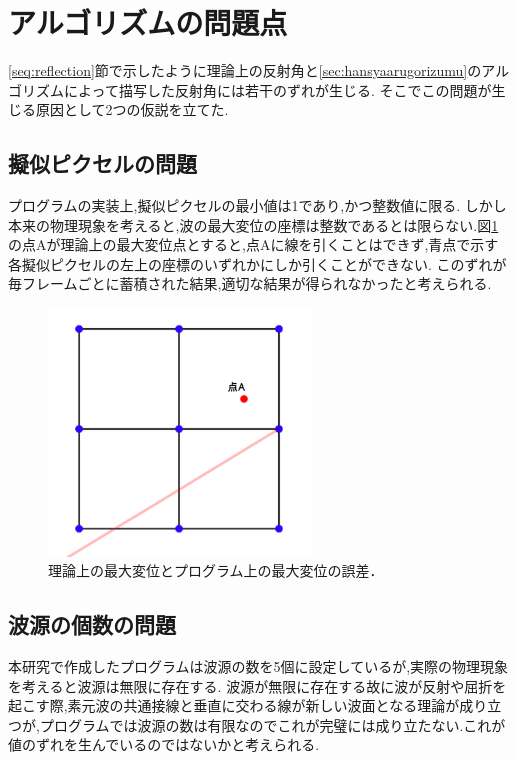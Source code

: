 \section{アルゴリズムの問題点}
\ref{seq:reflection}節で示したように理論上の反射角と\ref{sec:hansyaarugorizumu}のアルゴリズムによって描写した反射角には若干のずれが生じる. そこでこの問題が生じる原因として2つの仮説を立てた.
\subsection{擬似ピクセルの問題}
\label{seq:pxcelproblem}
プログラムの実装上,擬似ピクセルの最小値は1であり,かつ整数値に限る. しかし本来の物理現象を考えると,波の最大変位の座標は整数であるとは限らない.図\ref{fig:pixcelproblem}の点Aが理論上の最大変位点とすると,点Aに線を引くことはできず,青点で示す各擬似ピクセルの左上の座標のいずれかにしか引くことができない. このずれが毎フレームごとに蓄積された結果,適切な結果が得られなかったと考えられる.
\begin{figure}[htbp]
 \begin{center}
  \includegraphics[width=70mm]{../considaration/pixcelproblem.png}
 \end{center}
 \caption{理論上の最大変位とプログラム上の最大変位の誤差．}
 \label{fig:pixcelproblem}
\end{figure}

\subsection{波源の個数の問題}
本研究で作成したプログラムは波源の数を5個に設定しているが,実際の物理現象を考えると波源は無限に存在する.
波源が無限に存在する故に波が反射や屈折を起こす際,素元波の共通接線と垂直に交わる線が新しい波面となる理論が成り立つが,プログラムでは波源の数は有限なのでこれが完璧には成り立たない.これが値のずれを生んでいるのではないかと考えられる.









